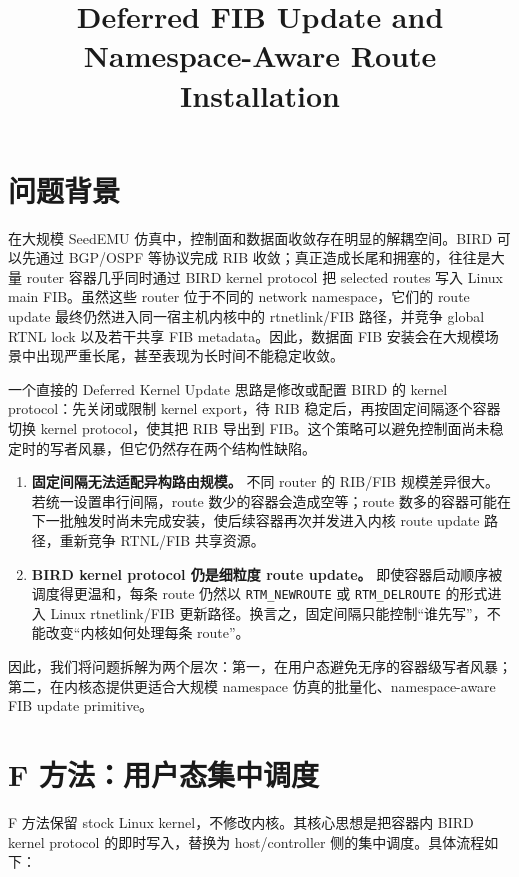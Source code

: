\documentclass[UTF8]{ctexart}
\title{Deferred FIB Update and Namespace-Aware Route Installation}
\author{}
\date{}
\newcommand{\code}[1]{\texttt{#1}}
\newcommand{\method}[1]{\textsc{#1}}
\begin{document}
\maketitle

\section{问题背景}

在大规模 SeedEMU 仿真中，控制面和数据面收敛存在明显的解耦空间。BIRD 可以先通过 BGP/OSPF 等协议完成 RIB 收敛；真正造成长尾和拥塞的，往往是大量 router 容器几乎同时通过 BIRD kernel protocol 把 selected routes 写入 Linux main FIB。虽然这些 router 位于不同的 network namespace，它们的 route update 最终仍然进入同一宿主机内核中的 rtnetlink/FIB 路径，并竞争 global RTNL lock 以及若干共享 FIB metadata。因此，数据面 FIB 安装会在大规模场景中出现严重长尾，甚至表现为长时间不能稳定收敛。

一个直接的 Deferred Kernel Update 思路是修改或配置 BIRD 的 kernel protocol：先关闭或限制 kernel export，待 RIB 稳定后，再按固定间隔逐个容器切换 kernel protocol，使其把 RIB 导出到 FIB。这个策略可以避免控制面尚未稳定时的写者风暴，但它仍然存在两个结构性缺陷。

\begin{enumerate}[leftmargin=1.5em]
  \item \textbf{固定间隔无法适配异构路由规模。} 不同 router 的 RIB/FIB 规模差异很大。若统一设置串行间隔，route 数少的容器会造成空等；route 数多的容器可能在下一批触发时尚未完成安装，使后续容器再次并发进入内核 route update 路径，重新竞争 RTNL/FIB 共享资源。
  \item \textbf{BIRD kernel protocol 仍是细粒度 route update。} 即使容器启动顺序被调度得更温和，每条 route 仍然以 \code{RTM\_NEWROUTE} 或 \code{RTM\_DELROUTE} 的形式进入 Linux rtnetlink/FIB 更新路径。换言之，固定间隔只能控制``谁先写''，不能改变``内核如何处理每条 route''。
\end{enumerate}

因此，我们将问题拆解为两个层次：第一，在用户态避免无序的容器级写者风暴；第二，在内核态提供更适合大规模 namespace 仿真的批量化、namespace-aware FIB update primitive。

\section{F 方法：用户态集中调度}

\method{F} 方法保留 stock Linux kernel，不修改内核。其核心思想是把容器内 BIRD kernel protocol 的即时写入，替换为 host/controller 侧的集中调度。具体流程如下：
\end{document}

